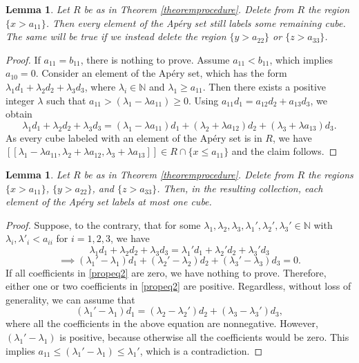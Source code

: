 \documentclass[12pt]{article}
\newtheorem{lemma}[thm]{Lemma}
\theoremstyle{remark}
\begin{document}
\begin{lemma}\label{lemmaminrelation1}
    Let $R$ be as in Theorem \ref{theoremprocedure}. Delete from $R$ the region $\{x > a_{11}\}$. Then every element of the Ap{\'e}ry set still labels some remaining cube. The same will be true if we instead delete the region $\{y > a_{22}\}$ or $\{z > a_{33}\}$.
\end{lemma}
\begin{proof}
If $a_{11} = b_{11}$, there is nothing to prove. Assume $a_{11} < b_{11}$, which implies $a_{10} = 0$. Consider an element of the Ap{\'e}ry set, which has the form $\lambda_1d_1 + \lambda_2d_2 + \lambda_3d_3$, where $\lambda_i \in \mathbb{N}$ and $\lambda_1 \geq a_{11}$. Then there exists a positive integer $\lambda$ such that $a_{11} > (\lambda_1 - \lambda a_{11}) \geq 0$. Using $a_{11}d_1 = a_{12}d_2 + a_{13}d_3$, we obtain
    \begin{equation}
        \lambda_1d_1 + \lambda_2d_2 + \lambda_3d_3 = (\lambda_1 - \lambda a_{11})d_1 + (\lambda_2+\lambda a_{12})d_2 + (\lambda_3+\lambda a_{13})d_3.
    \end{equation}
As every cube labeled with an element of the Ap{\'e}ry set is in $R$, we have $[[\lambda_1 - \lambda a_{11},\lambda_2+\lambda a_{12},\lambda_3+\lambda a_{13} ]] \in R \cap \{x \leq a_{11}\}$ and the claim follows.   
\end{proof}

\begin{lemma}\label{lemmaminrelation2}
    Let $R$ be as in Theorem \ref{theoremprocedure}. Delete from $R$ the regions $\{x > a_{11}\}$, $\{y > a_{22}\}$, and $\{z > a_{33}\}$. Then, in the resulting collection, each element of the Ap{\'e}ry set labels at most one cube.
\end{lemma}
\begin{proof}
     Suppose, to the contrary, that for some $\lambda_1, \lambda_2, \lambda_3,\lambda_1', \lambda_2', \lambda_3' \in \mathbb{N}$ with $\lambda_i ,\lambda'_i < a_{ii}$ for $i = 1,2,3$, we have
    \begin{equation}\label{propeq1}
        \lambda_1d_1 + \lambda_2d_2 + \lambda_3d_3 = \lambda_1'd_1 + \lambda_2'd_2 + \lambda_3'd_3 
    \end{equation}
    \begin{equation}\label{propeq2}
        \implies  (\lambda_1' - \lambda_1)d_1 + (\lambda_2' - \lambda_2)d_2 + (\lambda_3' - \lambda_3)d_3 = 0.
    \end{equation}
    If all coefficients in \eqref{propeq2} are zero, we have nothing to prove. Therefore, either one or two coefficients in \eqref{propeq2} are positive. Regardless, without loss of generality, we can assume that
    \begin{equation}\label{propeq3}
         (\lambda_1' - \lambda_1)d_1 = (\lambda_2 - \lambda_2')d_2 + (\lambda_3 - \lambda_3')d_3,
    \end{equation}
    where all the coefficients in the above equation are nonnegative. However, $(\lambda_1' - \lambda_1)$ is positive, because otherwise all the coefficients would be zero. This implies $a_{11} \leq (\lambda_1' - \lambda_1) \leq \lambda_1'$, which is a contradiction.
\end{proof}
\end{document}
